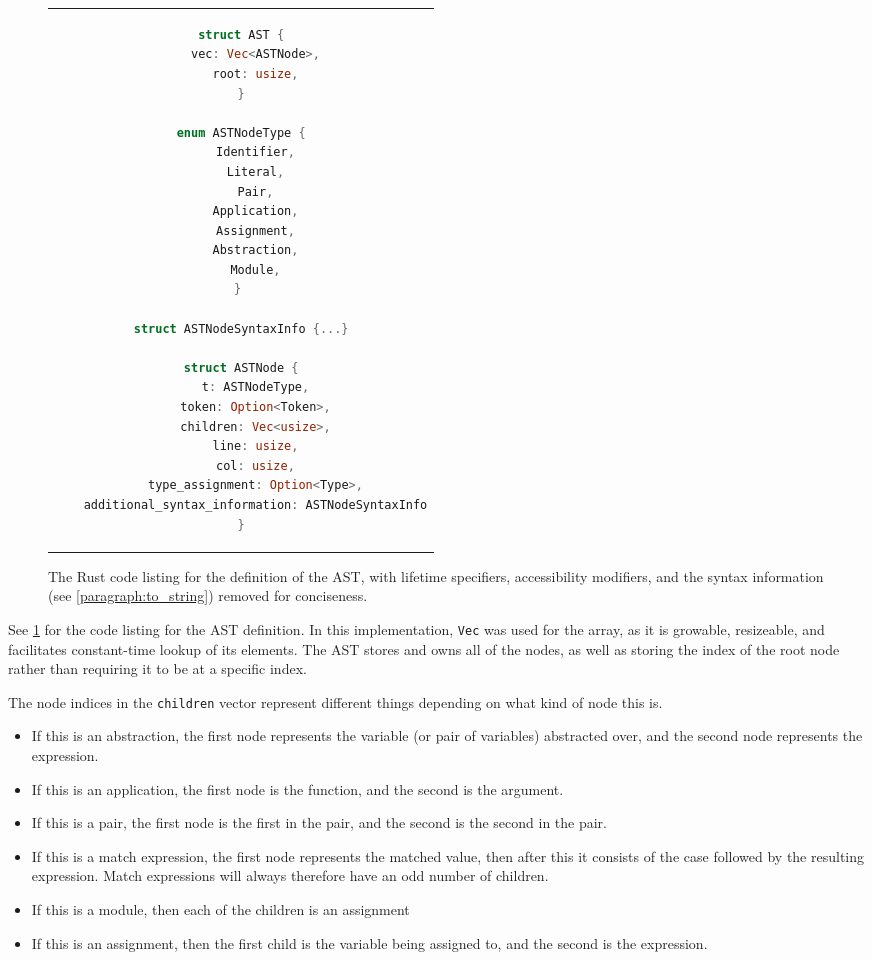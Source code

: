 \documentclass[
author=Kiran Sturt,
degree=BSc,
title=Implementing a Step by Step Evaluator for a Simple Functional Programming language,
unit=COMS30045,twoside]{dissertation}
\theoremstyle{definition}
\theoremstyle{break}
\theoremstyle{definition}
\begin{document}
\begin{figure}[t]
    \centering
    \begin{tabular}{c}
    \begin{lstlisting}[language=Rust]
struct AST {
    vec: Vec<ASTNode>,
    root: usize,
}

enum ASTNodeType {
    Identifier,
    Literal,
    Pair,
    Application,
    Assignment,
    Abstraction,
    Module,
} 

struct ASTNodeSyntaxInfo {...}

struct ASTNode {
    t: ASTNodeType,
    token: Option<Token>,
    children: Vec<usize>,
    line: usize,
    col: usize,
    type_assignment: Option<Type>,
    additional_syntax_information: ASTNodeSyntaxInfo
}
    \end{lstlisting}
    \end{tabular}
    \caption{The Rust code listing for the definition of the AST, with lifetime specifiers, accessibility modifiers, and the syntax information (see \ref{paragraph:to_string}) removed for conciseness.}
    \label{fig:ast_lst}
\end{figure}

See \ref{fig:ast_lst} for the code listing for the AST definition. In this implementation, \verb|Vec| was used for the array, as it is growable, resizeable, and facilitates constant-time lookup of its elements. The AST stores and owns all of the nodes, as well as storing the index of the root node rather than requiring it to be at a specific index. 

The node indices in the \verb|children| vector represent different things depending on what kind of node this is. 
\begin{itemize}
    \item If this is an abstraction, the first node represents the variable (or pair of variables) abstracted over, and the second node represents the expression.
    \item If this is an application, the first node is the function, and the second is the argument.
    \item If this is a pair, the first node is the first in the pair, and the second is the second in the pair.
    \item If this is a match expression, the first node represents the matched value, then after this it consists of the case followed by the resulting expression. Match expressions will always therefore have an odd number of children.
    \item If this is a module, then each of the children is an assignment
    \item If this is an assignment, then the first child is the variable being assigned to, and the second is the expression.
\end{itemize}
\end{document}
